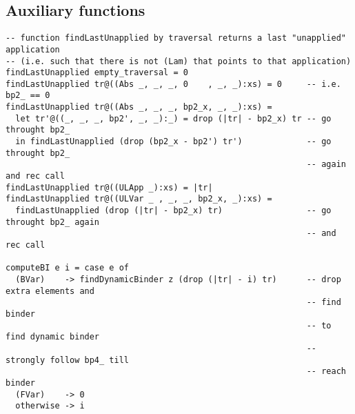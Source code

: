 \documentclass[a4paper, 12pt]{article} %
\begin{document}
\subsection*{Auxiliary functions}
\begin{verbatim}
-- function findLastUnapplied by traversal returns a last "unapplied" application
-- (i.e. such that there is not (Lam) that points to that application)
findLastUnapplied empty_traversal = 0
findLastUnapplied tr@((Abs _, _, _, 0    , _, _):xs) = 0     -- i.e. bp2_ == 0
findLastUnapplied tr@((Abs _, _, _, bp2_x, _, _):xs) =
  let tr'@((_, _, _, bp2', _, _):_) = drop (|tr| - bp2_x) tr -- go throught bp2_
  in findLastUnapplied (drop (bp2_x - bp2') tr')             -- go throught bp2_ 
                                                             -- again and rec call
findLastUnapplied tr@((ULApp _):xs) = |tr|
findLastUnapplied tr@((ULVar _ , _, _, bp2_x, _):xs) =
  findLastUnapplied (drop (|tr| - bp2_x) tr)                 -- go throught bp2_ again
                                                             -- and rec call

computeBI e i = case e of
  (BVar)    -> findDynamicBinder z (drop (|tr| - i) tr)      -- drop extra elements and
                                                             -- find binder
                                                             -- to find dynamic binder
                                                             -- strongly follow bp4_ till
                                                             -- reach binder
  (FVar)    -> 0
  otherwise -> i
\end{verbatim}
\end{document}
